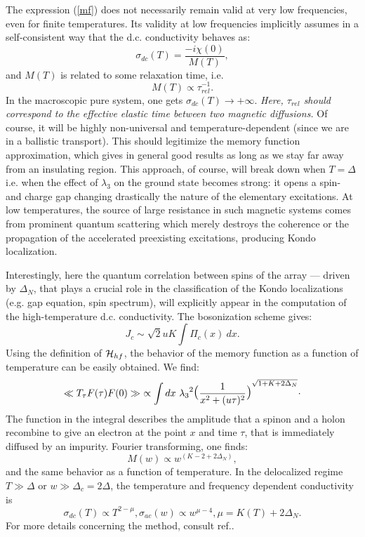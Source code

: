 The expression (\ref{mf}) does not necessarily remain valid at very
low frequencies,
even for finite temperatures. Its validity at low frequencies implicitly
assumes in a self-consistent way that the d.c. conductivity behaves as:
\begin{equation}
\sigma_{dc}(T)=\frac{-i\chi(0)}{M(T)},
\end{equation}
and $M(T)$ is related to some relaxation time, i.e.
\begin{equation}
\label{memory}
M(T)\propto \tau_{rel}^{-1}. 
\end{equation}
In the macroscopic pure system, one gets $\sigma_{dc}(T)\rightarrow +\infty$.
{\it Here, $\tau_{rel}$ should correspond to the effective 
elastic time between two magnetic diffusions.} Of course, it will be highly
non-universal and temperature-dependent (since 
we are in a ballistic transport). This should legitimize the memory 
function approximation, which gives
in general good results as long as we stay far away from an insulating
region.
This approach, of course, will break down when $T=\Delta$ i.e. when the
effect of $\lambda_3$ on the ground state becomes strong: it opens a 
spin- and charge gap changing drastically the nature of the elementary
excitations. At low temperatures, 
the source of large resistance in such magnetic systems comes
from prominent quantum scattering which merely
destroys the coherence or the propagation 
of the accelerated preexisting excitations, producing Kondo localization.

Interestingly, here the quantum 
correlation between spins of the array --- driven by $\Delta_N$,
that plays a crucial role in the classification
of the Kondo localizations (e.g. gap
equation, spin spectrum), will explicitly appear in the computation of the 
high-temperature d.c. conductivity.
\vskip 0.1cm
The bosonization scheme gives:
\begin{equation}
\label{current}
J_c\sim\sqrt{2}uK\int \Pi_c(x)\ dx.
\end{equation}
Using the definition of ${\cal H}_{hf}$, the behavior
of the memory function as a function of temperature can be
easily obtained. We find:
\begin{equation}
\ll T_{\tau} F(\tau)F(0)\gg\ \propto \int dx\ {\lambda_3}^2
{\hbox{\Large(}\frac{1}{x^2+(u\tau)^2}\hbox{\Large)}}
^{\sqrt{1+K+2\Delta_N}}\cdot
\end{equation}
The function in the integral describes the amplitude that a
spinon and a holon recombine to give an electron
at the point $x$ and time $\tau$, that is immediately
diffused by an impurity.
Fourier transforming, one finds: 
\begin{equation}
M(w)\propto w^{(K-2+2\Delta_N)}, 
\end{equation}
and the same behavior as a function of temperature.
In the delocalized regime
$T\gg\Delta$ or $w\gg\Delta_c=2\Delta$, the temperature and frequency dependent
conductivity is
\begin{equation}
\label{cond}
\sigma_{dc}(T)\propto T^{2-\mu},\sigma_{ac}(w)\propto
w^{\mu-4},\mu=K(T)+2\Delta_N.
\end{equation}
For more details concerning the method, consult ref.\cite{Giam3}.

